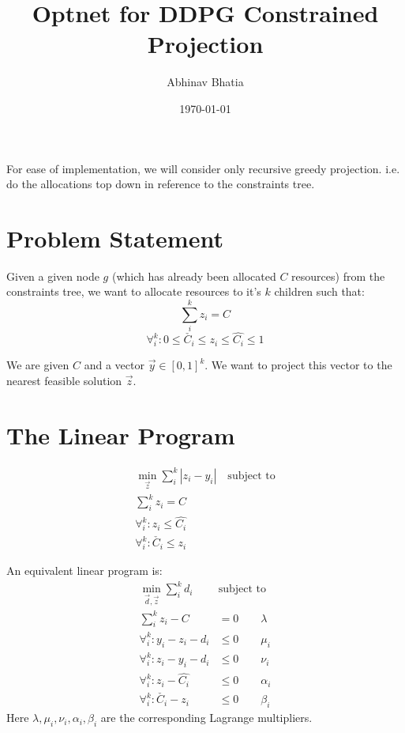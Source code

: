 \documentclass[11 pt]{article}
\begin{document}
\title{Optnet for DDPG Constrained Projection}
\author{Abhinav Bhatia}
\date{\today}
\maketitle

For ease of implementation, we will consider only recursive greedy projection. i.e. do the allocations top down in reference to the constraints tree.


\section{Problem Statement}

Given a given node $g$ (which has already been allocated $C$ resources) from the constraints tree, we want to allocate resources to it's $k$ children such that:
\[\sum_i^k z_i = C \]
\[\forall_i^k : 0 \le \check{C_i} \le z_i \le \hat{C_i} \le 1\]

We are given $C$ and a vector $\vec{y} \in [0, 1]^k$. We want to project this vector to the nearest feasible solution $\vec{z}$.


\section{The Linear Program}

\begin{align*}
    \underset{\vec{z}}{\min} \sum_i^k |z_i - y_i| \quad \text{subject to}\\
    \sum_i^k z_i = C\\
    \forall_i^k : z_i \le \hat{C_i}\\
    \forall_i^k : \check{C_i} \le z_i
\end{align*}

An equivalent linear program is:
\begin{equation} \label{lp}
    \begin{aligned}
        \underset{\vec{d},\vec{z}}{\min} \sum_i^k d_i \quad &\text{subject to} \\
        \sum_i^k z_i - C &= 0                   \qquad \lambda\\
        \forall_i^k : y_i - z_i - d_i &\le 0      \qquad \mu_i\\
        \forall_i^k : z_i - y_i - d_i &\le 0      \qquad \nu_i\\
        \forall_i^k : z_i - \hat{C_i} &\le 0      \qquad \alpha_i\\
        \forall_i^k : \check{C_i} - z_i &\le 0    \qquad \beta_i
    \end{aligned}
\end{equation}
Here $\lambda,\mu_i,\nu_i,\alpha_i,\beta_i$ are the corresponding Lagrange multipliers.
\end{document}
